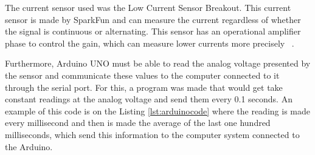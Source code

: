 The current sensor used was the Low Current Sensor Breakout. This current sensor is made by SparkFun and can measure the current regardless of whether the signal is continuous or alternating.  This sensor has an operational amplifier phase to control the gain, which can measure lower currents more precisely ~\cite{portela2016}.

Furthermore, Arduino UNO must be able to read the analog voltage presented by the sensor and communicate these values to the computer connected to it through the serial port. For this, a program was made that would get take constant readings at the analog voltage and send them every 0.1 seconds. An example of this code is on the Listing \ref{lst:arduinocode} where the reading is made every millisecond and then is made the average of the last one hundred milliseconds, which send this information to the computer system connected to the Arduino.

  


